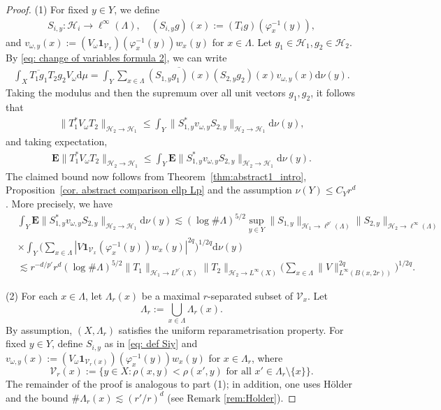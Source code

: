 \documentclass[12pt,reqno]{amsart}
\theoremstyle{definition}
\theoremstyle{remark}
\numberwithin{equation}{section}
\newcommand{\1}{\mathbbm{1}}
\renewcommand{\phi}{\varphi}
\def\rd{\mathrm{d}}
\newcommand{\one}{\mathbf{1}}
\begin{document}
\begin{proof}
(1) For fixed $y\in Y$, we define
  \begin{align}\label{eq: def Siy}
    S_{i,y}:\mathcal{H}_i\to \ell^{\infty}(\Lambda),\quad (S_{i,y}g)(x):=(T_ig)(\phi_x^{-1}(y)),
  \end{align}
  and $v_{\omega,y}(x):=(V_{\omega}\mathbf{1}_{\mathcal{V}_x})(\phi_x^{-1}(y))w_x(y)$ for $x\in\Lambda$.
  Let $g_1\in \mathcal{H}_1,g_2\in \mathcal{H}_2$. By \eqref{eq: change of variables formula 2}, we can write
  \begin{align*}
    \int_X \overline{T_1g_1}T_2g_2V_{\omega}\rd\mu
    = \int_Y\sum_{x\in\Lambda}\overline{(S_{1,y}g_1)(x)}(S_{2,y}g_2)(x)v_{\omega,y}(x)\rd\nu(y). 
  \end{align*}
  Taking the modulus and then the supremum over all unit vectors $g_1,g_2$, it follows that
  \begin{align*}
    \|T_1^*V_{\omega}T_2\|_{\mathcal{H}_2\to \mathcal{H}_1}\leq \int_Y \|S_{1,y}^*v_{\omega,y}S_{2,y}\|_{\mathcal{H}_2\to \mathcal{H}_1}   \rd\nu(y),
  \end{align*}
  and taking expectation,
  \begin{align*}
    \mathbf{E}\|T_1^*V_{\omega}T_2\|_{\mathcal{H}_2\to \mathcal{H}_1}\leq \int_Y \mathbf{E}\|S_{1,y}^*v_{\omega,y}S_{2,y}\|_{\mathcal{H}_2\to \mathcal{H}_1}   \rd\nu(y).
  \end{align*}
  The claimed bound now follows from Theorem~\ref{thm:abstract1_intro}, 
  Proposition~\ref{cor. abstract comparison ellp Lp} and the assumption $\nu(Y)\leq C_Yr^d$. More precisely, we have
  \begin{align*}
    & \int_Y \mathbf{E}\|S_{1,y}^*v_{\omega,y}S_{2,y}\|_{\mathcal{H}_2\to \mathcal{H}_1}   \rd\nu(y)
    \lesssim (\log\#\Lambda)^{5/2}\sup_{y\in Y}\|S_{1,y}\|_{\mathcal{H}_1\to \ell^{p'}(\Lambda)} \|S_{2,y}\|_{\mathcal{H}_2\to \ell^{\infty}(\Lambda)} \\
    & \times \int_Y \Big(\sum_{x\in\Lambda}|V\one_{\mathcal{V}_x}(\phi_x^{-1}(y))w_x(y)|^{2q}\Big)^{1/2q}\rd\nu(y) \\
    & \lesssim r^{-d/p'} r^{d}(\log\#\Lambda)^{5/2}\|T_1\|_{\mathcal{H}_1\to L^{p'}(X)}\|T_2\|_{\mathcal{H}_2\to L^{\infty}(X)}\Big(\sum_{x\in\Lambda}\|V\|_{L^{\infty}(B(x,2r))}^{2q}\Big)^{1/2q}.
  \end{align*}

(2) For each $x\in\Lambda$, let $\Lambda_r(x)$ be a maximal $r$-separated subset of $\mathcal{V}_x$.
  Let $$\Lambda_r:=\bigcup_{x\in\Lambda}\Lambda_r(x).$$
  By assumption, $(X,\Lambda_r)$ satisfies the uniform reparametrisation property.
  For fixed $y\in Y$, define $S_{i,y}$ as in \eqref{eq: def Siy}
  and $v_{\omega,y}(x):=(V_{\omega}\mathbf{1}_{\mathcal{V}_r(x)})(\phi_x^{-1}(y))w_x(y)$ for $x\in\Lambda_r$, where
     \[
    \mathcal{V}_r(x) := \{y\in X:\rho(x,y)<\rho(x',y)\mbox{ for all }x'\in\Lambda_r\setminus\{x\}\}.
\]
 The remainder of the proof is analogous to part (1); in addition, one uses H\"older and the bound $\#\Lambda_r(x)\lesssim (r'/r)^d$ (see Remark \ref{rem:Holder}).
\end{proof}
\end{document}
